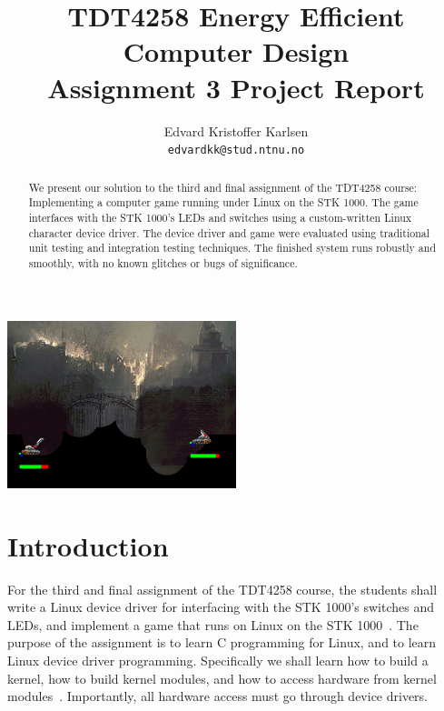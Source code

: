 \documentclass[a4paper,10pt]{article}
\title{
TDT4258 Energy Efficient Computer Design\\
Assignment 3 Project Report
}
\author{
  Edvard Kristoffer Karlsen\\
  \texttt{edvardkk@stud.ntnu.no}
}
\date {}
\begin{document}



\maketitle
\thispagestyle{empty}

\begin{abstract}
We present our solution to the third and final assignment of the TDT4258
course: Implementing a computer game running under Linux on the STK 1000.
The game interfaces with the STK 1000's LEDs and switches using a
custom-written Linux character device driver.  The device driver and game were
evaluated using traditional unit testing and integration testing techniques.
The finished system runs robustly and smoothly, with no known glitches or bugs
of significance.
\end{abstract}

\vspace{60pt}
\noindent
\begin{center}
\includegraphics[width=0.5\textwidth]{sc_game_play.png}
\end{center}


\clearpage

\setcounter{tocdepth}{2}
\tableofcontents

\clearpage


\section{Introduction}
For the third and final assignment of the TDT4258 course, the students shall
write a Linux device driver for interfacing with the STK 1000's switches and
LEDs, and implement a game that runs on Linux on the STK
1000~\cite{compendium}.  The purpose of the assignment is to learn C
programming for Linux, and to learn Linux device driver programming.
Specifically we shall learn how to build a kernel, how to build kernel
modules, and how to access hardware from kernel modules~\cite{compendium}.
Importantly, all hardware access must go through device
drivers.
\end{document}
